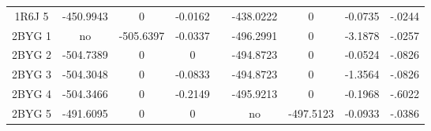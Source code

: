 \documentclass[a4paper,12pt]{article}
\begin{document}
\begin{table}[h]
\begin{tabular}{|c|c|c|c|c|c|c|c|c|}
        1R6J 5 & -450.9943 & 0 & -0.0162 & & -438.0222 & 0 & -0.0735 & -.0244 \\        
        2BYG 1 & no & -505.6397 & -0.0337 & & -496.2991 & 0 & -3.1878 & -.0257 \\        
        2BYG 2 & -504.7389 & 0 & 0 & & -494.8723 & 0 & -0.0524 & -.0826 \\        
        2BYG 3 & -504.3048 & 0 & -0.0833 & & -494.8723 & 0 & -1.3564 & -.0826 \\        
        2BYG 4 & -504.3466 & 0 & -0.2149 & & -495.9213 & 0 & -0.1968 & -.6022 \\        
        2BYG 5 & -491.6095 & 0 & 0 & & no & -497.5123 & -0.0933 & -.0386 \\       
    
    \hline


 \end{tabular}      
 \label{tab_echec_10_20}      
\end{table}
\end{document}
